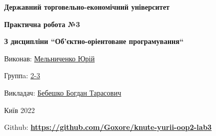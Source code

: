 \documentclass{article}
\begin{document}
\begin{titlepage}
    \begin{center}
        \Large\textbf{Державний торговельно-економічний університет}\\
        \vspace{2.5 em}

        \large\textbf{Практична робота №3}\\
        \vspace{1 em}

        \large\textbf{З дисципліни ``Об'єктно-оріентоване програмування``}\\
        \vspace{1 em}

    \end{center}
    \vspace{3.5 em}

    Виконав: \underline{Мельниченко Юрій}\\
    \vspace{-0.3 em}

    Группa: \underline{2-3}\\
    \vspace{-0.3 em}

    Викладач: \underline{Бебешко Богдан Тарасович}\\

    \vfill

    \begin{center}
        Київ 2022
    \end{center}
\end{titlepage}

\noindent
Github: \textbf{\href{https://github.com/Goxore/knute-yurii-oop2-lab3}{https://github.com/Goxore/knute-yurii-oop2-lab3}} \\
\end{document}
